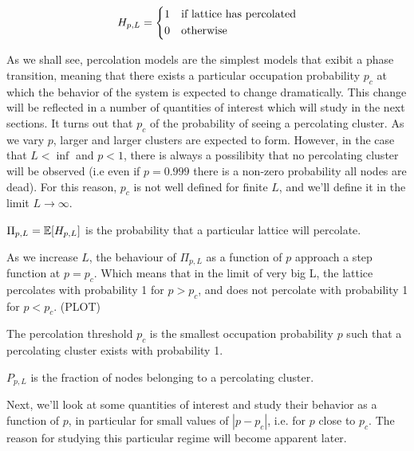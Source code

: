 % 	
%         
%         
\begin{defn}
\[
	H_{p,L} = 
    \begin{dcases}
        1 & \text{if lattice has percolated} \\
        0 & \text{otherwise} \\
    \end{dcases}
\]
\end{defn}
As we shall see, percolation models are the simplest models that exibit a phase transition, meaning that there exists a particular occupation probability $p_c$ at which the behavior of the system is expected to change dramatically. This change will be reflected in a number of quantities of interest which will study in the next sections. It turns out that $p_c$ of the probability of seeing a percolating cluster.
As we vary $p$, larger and larger clusters are expected to form. However, in the case that $L < \inf$ and $p < 1$, there is always a possilibity that no percolating cluster will be observed (i.e even if $p = 0.999$ there is a non-zero probability all nodes are dead). For this reason, $p_c$ is not well defined for finite $L$, and we'll  define it in the limit $L \to \infty$. 

\begin{defn}
$\Pi_{p,L} = \operatorname{\mathbb{E}}[H_{p,L}]$ is the probability that a particular lattice will percolate.
\end{defn}

As we increase $L$, the behaviour of $\Pi_{p,L}$ as a function of $p$ approach a step function at $p=p_c$. Which means that in the limit of very big L, the lattice percolates with probability 1 for $p > p_c$, and does not percolate with probability 1 for $p < p_c$. (PLOT)

\begin{defn}
The percolation threshold $p_c$ is the smallest occupation probability $p$ such that a percolating cluster exists with probability 1. 
\end{defn}


\begin{defn}
$P_{p,L}$ is the fraction of nodes belonging to a percolating cluster.
\end{defn}


Next, we'll look at some quantities of interest and study their behavior as a function of $p$, in particular for small values of $|p - p_c|$, i.e. for $p$ close to $p_c$. The reason for studying this particular regime will become apparent later.


